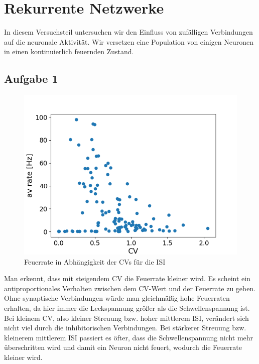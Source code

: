 \documentclass[10pt,a4paper]{scrartcl}
\begin{document}
\newpage


\section{Rekurrente Netzwerke}
In diesem Versuchsteil untersuchen wir den Einfluss von zufälligen Verbindungen auf die neuronale Aktivität. Wir versetzen eine Population von einigen Neuronen in einen kontinuierlich feuernden Zustand. 

\subsection{Aufgabe 1}

\begin{figure} [ht]
\begin{center}
\label{fig:abb38}
\caption{Feuerrate in Abhängigkeit der CVs für die ISI}
\includegraphics[scale=0.45]{pictures/decorr_rate_over_cv.png}
\end{center}
\end{figure}

\noindent Man erkennt, dass mit steigendem CV die Feuerrate kleiner wird. Es scheint ein antiproportionales Verhalten zwischen dem CV-Wert und der Feuerrate zu geben. Ohne synaptische Verbindungen würde man gleichmäßig hohe Feuerraten erhalten, da hier immer die Leckspannung größer als die Schwellenspannung ist. Bei kleinem CV, also kleiner Streuung bzw. hoher mittlerem ISI, verändert sich nicht viel durch die inhibitorischen Verbindungen. Bei stärkerer Streuung bzw. kleinerem mittlerem ISI passiert es öfter, dass die Schwellenspannung nicht mehr überschritten wird und damit ein Neuron nicht feuert, wodurch die Feuerrate kleiner wird.
\end{document}
